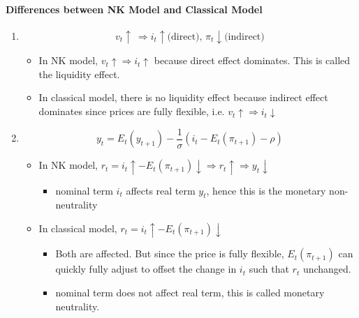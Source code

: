 \documentclass{article}
\begin{document}
\paragraph{Differences between NK Model and Classical Model}
\begin{enumerate}
    \item $$v_t\uparrow\ \Rightarrow i_t\uparrow \text{(direct), } \pi_t \downarrow \text{(indirect)}$$
    \begin{itemize}
        \item In NK model, $v_t \uparrow \Rightarrow i_t \uparrow$ because direct effect dominates. This is called the liquidity effect.
        \item In classical model, there is no liquidity effect because indirect effect dominates since prices are fully flexible, i.e. $v_t \uparrow \Rightarrow i_t \downarrow$
    \end{itemize}

    \item $$y_t = E_t(y_{t+1}) - \frac{1}{\sigma}(i_t - E_t(\pi_{t+1}) - \rho)$$
    \begin{itemize}
        \item In NK model, $r_t = i_t \uparrow - E_t(\pi_{t+1})\downarrow \Rightarrow r_t\uparrow \Rightarrow y_t \downarrow$
        \begin{itemize}
            \item nominal term $i_t$ affects real term $y_t$, hence this is the monetary non-neutrality
        \end{itemize}

        \item In classical model, $r_t = i_t\uparrow - E_t(\pi_{t+1})\downarrow$
        \begin{itemize}
            \item Both are affected. But since the price is fully flexible, $E_t(\pi_{t+1})$ can quickly fully adjust to offset the change in $i_t$ such that $r_t$ unchanged.
            \item nominal term does not affect real term, this is called monetary neutrality.
        \end{itemize}
    \end{itemize}

\end{enumerate}
\end{document}
